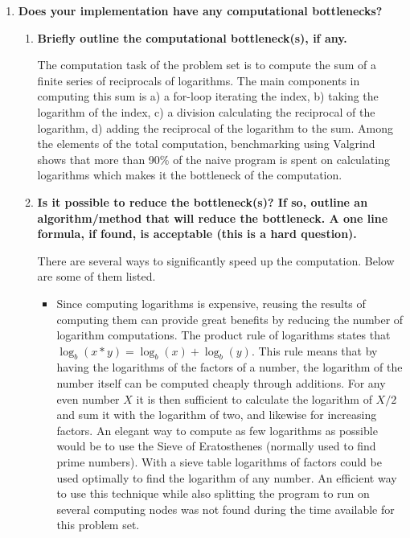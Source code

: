 \begin{enumerate}
\begin{enumerate}
\begin{enumerate}
\end{enumerate}

\end{enumerate}

\item \textbf{Does your implementation have any computational bottlenecks?}

\begin{enumerate}

\item \textbf{Briefly outline the computational bottleneck(s), if any.}

The computation task of the problem set is to compute the sum of a finite series of reciprocals of logarithms. The main components in computing this sum is a) a for-loop iterating the index, b) taking the logarithm of the index, c) a division calculating the reciprocal of the logarithm, d) adding the reciprocal of the logarithm to the sum. Among the elements of the total computation, benchmarking using Valgrind shows that more than 90\% of the naive program is spent on calculating logarithms which makes it the bottleneck of the computation.

\item \textbf{Is it possible to reduce the bottleneck(s)? If so, outline an algorithm/method that will reduce the bottleneck. A one line formula, if found, is acceptable (this is a hard question).}

There are several ways to significantly speed up the computation. Below are some of them listed.

\begin{itemize}

\item Since computing logarithms is expensive, reusing the results of computing them can provide great benefits by reducing the number of logarithm computations. The product rule of logarithms states that $\log_{b}(x*y)=\log_{b}(x) + \log_{b}(y)$. This rule means that by having the logarithms of the factors of a number, the logarithm of the number itself can be computed cheaply through additions. For any even number $X$ it is then sufficient to calculate the logarithm of $X/2$ and sum it with the logarithm of two, and likewise for increasing factors. An elegant way to compute as few logarithms as possible would be to use the Sieve of Eratosthenes (normally used to find prime numbers). With a sieve table logarithms of factors could be used optimally to find the logarithm of any number. An efficient way to use this technique while also splitting the program to run on several computing nodes was not found during the time available for this problem set.


\end{itemize}
\end{enumerate}
\end{enumerate}
